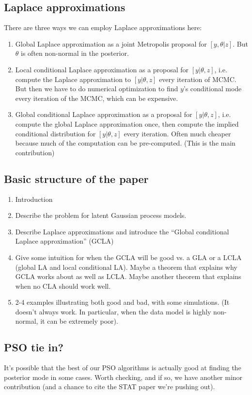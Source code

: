 \documentclass[12pt]{article}
\begin{document}
\subsection{Laplace approximations}
There are three ways we can employ Laplace approximations here:
\begin{enumerate}
\item Global Laplace approximation as a joint Metropolis proposal for $[y,\theta|z]$. But $\theta$ is often non-normal in the posterior.
\item Local conditional Laplace approximation as a proposal for $[y|\theta,z]$, i.e. compute the Laplace approximation to $[y|\theta,z]$ every iteration of MCMC. But then we have to do numerical optimization to find $y$'s conditional mode every iteration of the MCMC, which can be expensive.
\item Global conditional Laplace approximation as a proposal for $[y|\theta,z]$, i.e. compute the global Laplace approximation once, then compute the implied conditional distribution for $[y|\theta,z]$ every iteration. Often much cheaper because much of the computation can be pre-computed. (This is the main contribution)
\end{enumerate}

\subsection{Basic structure of the paper}
\begin{enumerate}
\item Introduction
\item Describe the problem for latent Gaussian process models.
\item Describe Laplace approximations and introduce the ``Global conditional Laplace approximation'' (GCLA)
\item Give some intuition for when the GCLA will be good vs. a GLA or a LCLA (global LA and local conditional LA). Maybe a theorem that explains why GCLA works about as well as LCLA. Maybe another theorem that explains when no CLA should work well.
\item 2-4 examples illustrating both good and bad, with some simulations. (It doesn't always work. In particular, when the data model is highly non-normal, it can be extremely poor).
\end{enumerate}

\subsection{PSO tie in?}
It's possible that the best of our PSO algorithms is actually good at finding the posterior mode in some cases. Worth checking, and if so, we have another minor contribution (and a chance to cite the STAT paper we're pushing out).
\end{document}
